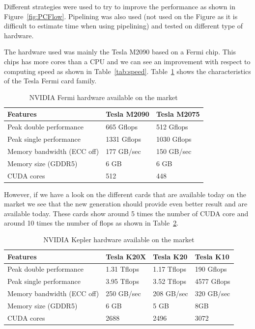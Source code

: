 Different strategies were used to try to improve the performance as shown in Figure~\ref{fig:PCFlow}. Pipelining was also used (not used on the Figure as it is difficult to estimate time when using pipelining) and tested on different type of hardware.

The hardware used was mainly the Tesla M2090 based on a Fermi chip. This chips has more cores than a CPU and we can see an improvement with respect to computing speed as shown in Table~\ref{tab:speed}. Table~\ref{tab:fermi} shows the characteristics of the Tesla Fermi card family.

\begin{table}[H]
\caption{NVIDIA Fermi hardware available on the market}
\label{tab:fermi}
\centering
\begin{tabular}{|l|l|l|}
\hline
Features & Tesla M2090 & Tesla M2075 \\
\hline
\hline
Peak double performance & 665 Gflops  & 512 Gflops \\
\hline
Peak single performance & 1331 Gflops & 1030 Gflops \\
\hline
Memory bandwidth (ECC off) & 177 GB/sec & 150 GB/sec \\
\hline
Memory size (GDDR5) & 6 GB & 6 GB \\
\hline
CUDA cores & 512 & 448 \\
\hline
\end{tabular}
\end{table}

However, if we have a look on the different cards that are available today on the market we see that the new generation should provide even better result and are available today. These cards show around 5 times the number of \gls{CUDA} core and around 10 times the number of \gls{flops} as shown in Table~\ref{tab:kepler}.

\begin{table}[H]
\centering
\caption{NVIDIA Kepler hardware available on the market}
\label{tab:kepler}
\begin{tabular}{|l|l|l|l|}
\hline
Features & Tesla K20X & Tesla K20 & Tesla K10 \\
\hline
\hline
Peak double performance & 1.31 Tflops & 1.17 Tflops & 190 Gflops \\
\hline
Peak single performance & 3.95 Tflops & 3.52 Tflops & 4577 Gflops \\
\hline
Memory bandwidth (ECC off) & 250 GB/sec & 208 GB/sec & 320 GB/sec \\
\hline
Memory size (GDDR5) & 6 GB & 5 GB & 8GB \\
\hline
CUDA cores & 2688 & 2496 & 3072 \\
\hline
\end{tabular}
\end{table}


